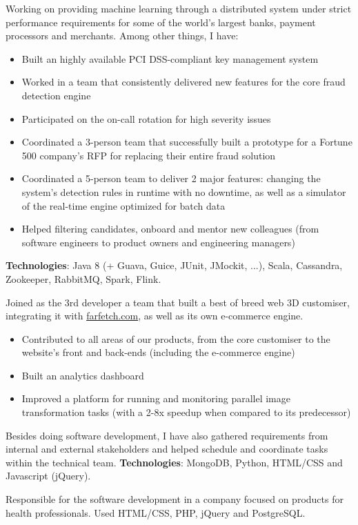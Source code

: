 \documentclass[11pt,a4paper]{moderncv}
\begin{document}
{Working on providing machine learning through a distributed system under strict performance requirements for some of the world's largest banks, payment processors and merchants.
Among other things, I have:
\begin{itemize}
  \item Built an highly available PCI DSS-compliant key management system
  \item Worked in a team that consistently delivered new features for the core fraud detection engine
  \item Participated on the on-call rotation for high severity issues
  \item Coordinated a 3-person team that successfully built a prototype for a Fortune 500 company's RFP for replacing their entire fraud solution
  \item Coordinated a 5-person team to deliver 2 major features: changing the system's detection rules in runtime with no downtime, as well as a simulator of the real-time engine optimized for batch data
  \item Helped filtering candidates, onboard and mentor new colleagues (from software engineers to product owners and engineering managers)
\end{itemize}
\textbf{Technologies}: Java 8 (+ Guava, Guice, JUnit, JMockit, ...), Scala, Cassandra, Zookeeper, RabbitMQ, Spark, Flink.}
{Joined as the 3rd developer a team that built a best of breed web 3D customiser,
integrating it with \href{https://www.farfetch.com/}{farfetch.com}, as well as
its own e-commerce engine.
\begin{itemize}
  \item Contributed to all areas of our products, from the core
  customiser to the website's front and back-ends (including the e-commerce engine)
  \item Built an analytics dashboard
  \item Improved a platform for running and monitoring parallel image transformation tasks
  (with a 2-8x speedup when compared to its predecessor)
\end{itemize}
Besides doing software development, I have also gathered requirements from internal and external
stakeholders and helped schedule and coordinate tasks within the technical team. \textbf{Technologies}: MongoDB, Python, HTML/CSS and Javascript (jQuery).
}
{Responsible for the software development in a company focused on products for
health professionals. Used HTML/CSS, PHP, jQuery and PostgreSQL.}
\vspace{2mm}
\end{document}
